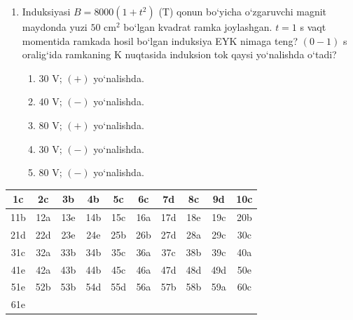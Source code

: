 \begin{enumerate}

\begin{enumerate}[label=\Alph*)]
\item tortiladi, soat strelkasiga qarama-qarshi.
\item qochadi, soat strelkasi bo‘ylab.
\item qochadi, soat strelkasiga qarama-qarshi.
\item tortiladi, soat strelkasi bo‘ylab.
\item qochmaydi va tortilmaydi, tok kuchi nolga teng.
\end{enumerate}

\item Induksiyasi $B=8000(1+t^2)$ (T) qonun bo‘yicha o‘zgaruvchi magnit maydonda yuzi $50$ cm$^2$ bo‘lgan kvadrat ramka joylashgan. $t=1$ s vaqt momentida ramkada hosil bo‘lgan induksiya EYK nimaga teng? $(0-1)$ s oralig‘ida ramkaning K nuqtasida induksion tok qaysi yo‘nalishda o‘tadi?
\begin{enumerate}[label=\Alph*)]
\item 30 V; $(+)$ yo‘nalishda.
\item 40 V; $(-)$ yo‘nalishda.
\item 80 V; $(+)$ yo‘nalishda.
\item 30 V; $(-)$ yo‘nalishda.
\item 80 V; $(-)$ yo‘nalishda.
\end{enumerate}

\end{enumerate}

\begin{table}[!ht]
\centering
\begin{tabular}{|c|c|c|c|c|c|c|c|c|c|}
\hline
1c & 2c & 3b & 4b & 5c & 6c & 7d & 8c & 9d & 10c \\ \hline
11b & 12a & 13e & 14b & 15c & 16a & 17d & 18e & 19c & 20b \\ \hline
21d & 22d & 23e & 24e & 25b & 26b & 27d & 28a & 29c & 30c \\ \hline
31c & 32a & 33b & 34b & 35c & 36a & 37c & 38b & 39c & 40a \\ \hline
41e & 42a & 43b & 44b & 45c & 46a & 47d & 48d & 49d & 50e \\ \hline
51e & 52b & 53b & 54d & 55d & 56a & 57b & 58b & 59a & 60c \\ \hline
61e &  &  &  &  &  &  &  &  &  \\ \hline
\end{tabular}
\end{table}
